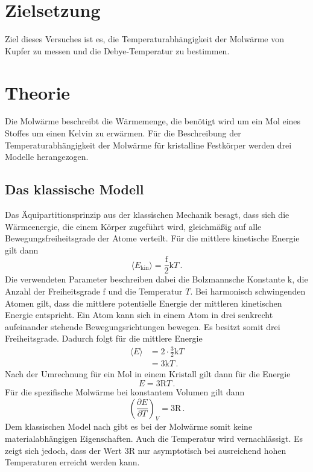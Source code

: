 \section{Zielsetzung}
Ziel dieses Versuches ist es, die Temperaturabhängigkeit der Molwärme von Kupfer
zu messen und die Debye-Temperatur zu bestimmen.
\section{Theorie}
Die Molwärme beschreibt die Wärmemenge, die benötigt wird um ein Mol eines
Stoffes um einen Kelvin zu erwärmen. Für die Beschreibung der
Temperaturabhängigkeit der Molwärme für kristalline Festkörper
werden drei Modelle herangezogen.

\subsection{Das klassische Modell}
Das Äquipartitionsprinzip aus der klassischen Mechanik besagt, dass sich die
Wärmeenergie, die einem Körper zugeführt wird, gleichmäßig auf alle
Bewegungsfreiheitsgrade der Atome verteilt. Für die mittlere kinetische
Energie gilt dann
\begin{equation}
  \langle E_{\text{kin}} \rangle = \frac{\text{f}}{2} \text{k} T \, .
\end{equation}
Die verwendeten Parameter beschreiben dabei die Bolzmannsche Konstante
$\text{k}$, die Anzahl der Freiheitsgrade $\text{f}$ und die Temperatur $T$. Bei
harmonisch schwingenden Atomen gilt, dass die mittlere potentielle Energie
der mittleren kinetischen Energie entspricht. Ein Atom kann sich in einem
Atom in drei senkrecht aufeinander stehende Bewegungsrichtungen bewegen. Es
besitzt somit drei Freiheitsgrade. Dadurch folgt für die mittlere Energie
\begin{align*}
  \langle E \rangle &= 2 \cdot \frac{3}{2} \text{k} T \\
                    &= 3 \text{k} T  \, .
\end{align*}
Nach der Umrechnung für ein Mol in einem Kristall gilt dann für die Energie
\begin{equation}
  E = 3 \text{R} T \, .
\end{equation}
Für die spezifische Molwärme bei konstantem Volumen gilt dann
\begin{equation}
  \left(\frac{\partial E}{\partial T}\right)_{\!\! V} = 3 \text{R} \, .
\end{equation}
Dem klassischen Model nach gibt es bei der Molwärme somit keine
materialabhängigen Eigenschaften. Auch die Temperatur wird vernachlässigt.
Es zeigt sich jedoch, dass der Wert $3 \text{R}$ nur asymptotisch bei
ausreichend hohen Temperaturen erreicht werden kann.

